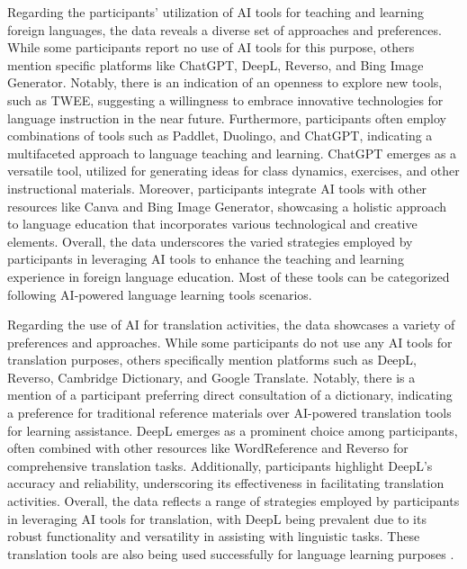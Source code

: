 Regarding the participants' utilization of AI tools for
teaching and learning foreign languages, the data reveals a diverse set
of approaches and preferences. While some participants report no use of
AI tools for this purpose, others mention specific platforms like
ChatGPT, DeepL, Reverso, and Bing Image Generator. Notably, there is an
indication of an openness to explore new tools, such as TWEE, suggesting
a willingness to embrace innovative technologies for language
instruction in the near future. Furthermore, participants often employ
combinations of tools such as Paddlet, Duolingo, and ChatGPT, indicating
a multifaceted approach to language teaching and learning. ChatGPT
emerges as a versatile tool, utilized for generating ideas for class
dynamics, exercises, and other instructional materials. Moreover,
participants integrate AI tools with other resources like Canva and Bing
Image Generator, showcasing a holistic approach to language education
that incorporates various technological and creative elements. Overall,
the data underscores the varied strategies employed by participants in
leveraging AI tools to enhance the teaching and learning experience in
foreign language education. Most of these tools can be categorized
following  AI-powered language learning tools
scenarios.

Regarding the use of AI for translation activities, the data showcases a
variety of preferences and approaches. While some participants do not
use any AI tools for translation purposes, others specifically mention
platforms such as DeepL, Reverso, Cambridge Dictionary, and Google
Translate. Notably, there is a mention of a participant preferring
direct consultation of a dictionary, indicating a preference for
traditional reference materials over AI-powered translation tools for
learning assistance. DeepL emerges as a prominent choice among
participants, often combined with other resources like WordReference and
Reverso for comprehensive translation tasks. Additionally, participants
highlight DeepL's accuracy and reliability, underscoring
its effectiveness in facilitating translation activities. Overall, the
data reflects a range of strategies employed by participants in
leveraging AI tools for translation, with DeepL being prevalent due to
its robust functionality and versatility in assisting with linguistic
tasks. These translation tools are also being used successfully for
language learning purposes \cite{birdsell2022,cotellikureth2023}.

